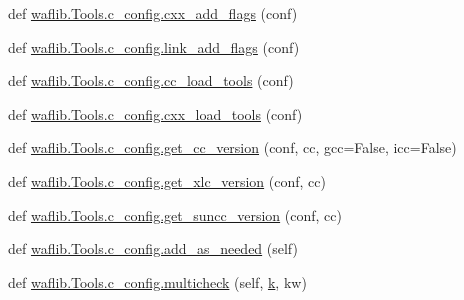 \begin{DoxyCompactItemize}
\item 
def \hyperlink{namespacewaflib_1_1_tools_1_1c__config_a68d43a67259ff2dc914e1a4e46a8d876}{waflib.\+Tools.\+c\+\_\+config.\+cxx\+\_\+add\+\_\+flags} (conf)
\item 
def \hyperlink{namespacewaflib_1_1_tools_1_1c__config_a3dc8e6c2c3381ead4f4fd243414bd081}{waflib.\+Tools.\+c\+\_\+config.\+link\+\_\+add\+\_\+flags} (conf)
\item 
def \hyperlink{namespacewaflib_1_1_tools_1_1c__config_a4b0405110f79509aa25cf9830827c7ac}{waflib.\+Tools.\+c\+\_\+config.\+cc\+\_\+load\+\_\+tools} (conf)
\item 
def \hyperlink{namespacewaflib_1_1_tools_1_1c__config_a2c649c982fe806a7c7d612e0fdf9625d}{waflib.\+Tools.\+c\+\_\+config.\+cxx\+\_\+load\+\_\+tools} (conf)
\item 
def \hyperlink{namespacewaflib_1_1_tools_1_1c__config_a1a7139cf5457328169035081a4e54237}{waflib.\+Tools.\+c\+\_\+config.\+get\+\_\+cc\+\_\+version} (conf, cc, gcc=False, icc=False)
\item 
def \hyperlink{namespacewaflib_1_1_tools_1_1c__config_aa104c14551a53eba46cdf5029fa4fe7c}{waflib.\+Tools.\+c\+\_\+config.\+get\+\_\+xlc\+\_\+version} (conf, cc)
\item 
def \hyperlink{namespacewaflib_1_1_tools_1_1c__config_ac52ede426d901fc009aee1736e3c972c}{waflib.\+Tools.\+c\+\_\+config.\+get\+\_\+suncc\+\_\+version} (conf, cc)
\item 
def \hyperlink{namespacewaflib_1_1_tools_1_1c__config_a2346d9d7babb7db31efbb64c1ee38fba}{waflib.\+Tools.\+c\+\_\+config.\+add\+\_\+as\+\_\+needed} (self)
\item 
def \hyperlink{namespacewaflib_1_1_tools_1_1c__config_a2fa8b1e700557368498338d9c4821f37}{waflib.\+Tools.\+c\+\_\+config.\+multicheck} (self, \hyperlink{rfft2d_test_m_l_8m_adc468c70fb574ebd07287b38d0d0676d}{k}, kw)
\end{DoxyCompactItemize}
